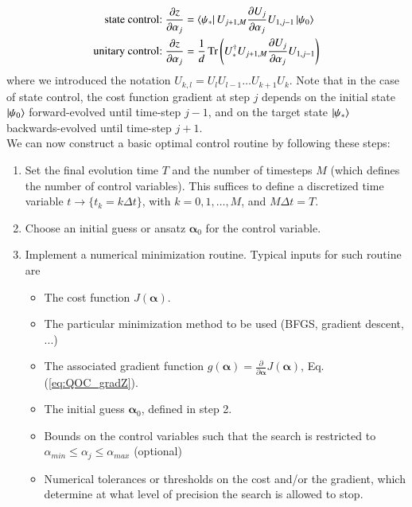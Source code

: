 \begin{align}
    \text{state control:} & \     \frac{\partial z}{\partial \alpha_j} = \bra{\psi_\ast}U_{j+1,M}\frac{\partial U_j}
    {\partial \alpha_j}U_{1,j-1}\ket{\psi_0}\\
    \text{unitary control:} & \ \frac{\partial z}{\partial \alpha_j} = \frac{1}{d}\Tr\left(U_\ast^\dagger U_{j+1,M}\frac{\partial U_j}
    {\partial \alpha_j}U_{1,j-1}\right)
\end{align}
where we introduced the notation $U_{k,l}=U_l U_{l-1}\ldots U_{k+1}U_k$. Note that in the case of state control, the cost function gradient at step $j$ depends on the initial state $\ket{\psi_0}$ forward-evolved until time-step $j-1$, and on the target state $\ket{\psi_\ast}$ backwards-evolved until time-step $j+1$.\\

We can now construct a basic optimal control routine by following these steps:

\begin{enumerate}
    \item Set the final evolution time $T$ and the number of timesteps $M$ (which defines the number of control variables). This suffices to define a discretized time variable $t\rightarrow \{t_k = k\Delta t\}$, with $k=0,1,\ldots,M$, and $M\Delta t=T$.
    \item Choose an initial guess or ansatz $\bm{\alpha}_0$ for the control variable. 
    \item Implement a numerical minimization routine. Typical inputs for such routine are
    \begin{itemize}
        \item The cost function $J(\bm{\alpha})$.
        \item The particular minimization method to be used (BFGS, gradient descent, ...)
        \item The associated gradient function $g(\bm{\alpha})=\frac{\partial}{\partial \bm{\alpha}}J(\bm{\alpha})$, Eq. (\ref{eq:QOC_gradZ}).
        \item The initial guess $\bm{\alpha}_0$, defined in step 2.
        \item Bounds on the control variables such that the search is restricted to $\alpha_{min}\leq \alpha_j \leq \alpha_{max}$ (optional)
        \item Numerical tolerances or thresholds on the cost and/or the gradient, which determine at what level of precision the search is allowed to stop.
    \end{itemize}
\end{enumerate}


